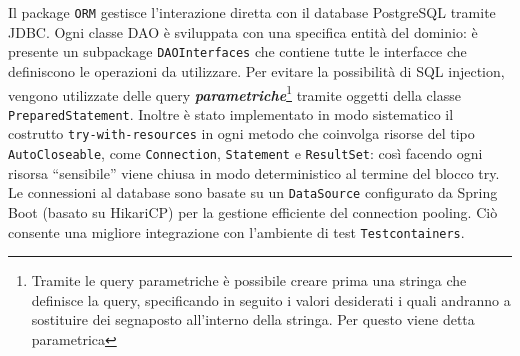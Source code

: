 \documentclass[
  italian,
  paper=a4,
  ,captions=tableheading
]{scrbook}
\newcommand{\passthrough}[1]{#1}
\begin{document}
Il package \passthrough{\lstinline!ORM!} gestisce l'interazione diretta
con il database PostgreSQL tramite JDBC. Ogni classe DAO è sviluppata
con una specifica entità del dominio: è presente un subpackage
\passthrough{\lstinline!DAOInterfaces!} che contiene tutte le interfacce
che definiscono le operazioni da utilizzare. Per evitare la possibilità
di SQL injection, vengono utilizzate delle query
\textbf{\emph{parametriche}}\footnote{Tramite le query parametriche è possibile creare prima una stringa che definisce la query, specificando in seguito i valori desiderati i quali andranno a sostituire dei segnaposto all’interno della stringa. Per questo viene detta parametrica}
tramite oggetti della classe
\passthrough{\lstinline!PreparedStatement!}. Inoltre è stato
implementato in modo sistematico il costrutto
\passthrough{\lstinline!try-with-resources!} in ogni metodo che
coinvolga risorse del tipo \passthrough{\lstinline!AutoCloseable!}, come
\passthrough{\lstinline!Connection!},
\passthrough{\lstinline!Statement!} e
\passthrough{\lstinline!ResultSet!}: così facendo ogni risorsa
``sensibile'' viene chiusa in modo deterministico al termine del blocco
try. Le connessioni al database sono basate su un
\passthrough{\lstinline!DataSource!} configurato da Spring Boot (basato
su HikariCP) per la gestione efficiente del connection pooling. Ciò
consente una migliore integrazione con l'ambiente di test
\passthrough{\lstinline!Testcontainers!}.
\end{document}
